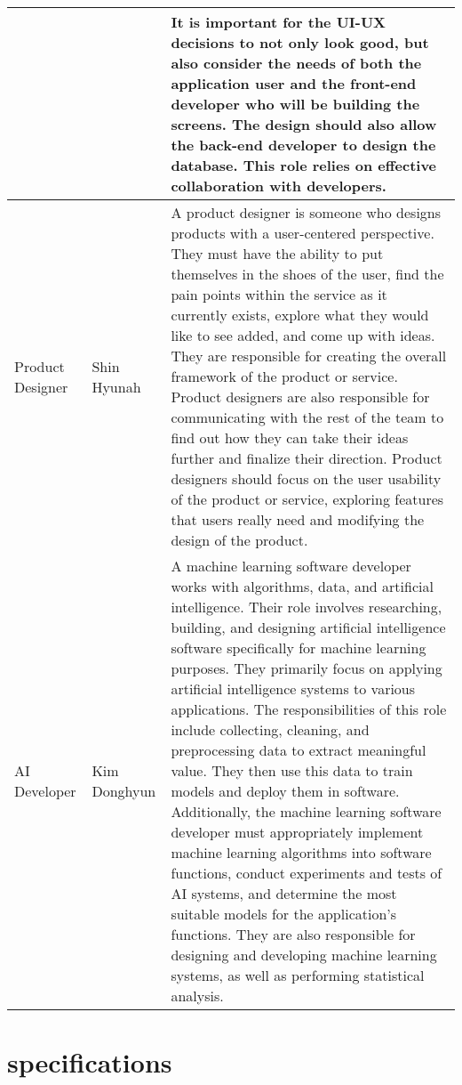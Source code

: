 \documentclass[conference, a4paper]{IEEEtran}
\begin{document}
\newpage 

\begin{table}[h]
\centering
\setlength{\tabcolsep}{12pt}
\renewcommand{\arraystretch}{1.5}
\begin{tabular}{|p{1cm}|p{1.5cm}|p{4cm}|}
\hline
& & It is important for the UI-UX decisions to not only look good, but also consider the needs of both the application user and the front-end developer who will be building the screens. The design should also allow the back-end developer to design the database. This role relies on effective collaboration with developers.\\
\hline
Product Designer & Shin Hyunah & A product designer is someone who designs products with a user-centered perspective. They must have the ability to put themselves in the shoes of the user, find the pain points within the service as it currently exists, explore what they would like to see added, and come up with ideas. They are responsible for creating the overall framework of the product or service. Product designers are also responsible for communicating with the rest of the team to find out how they can take their ideas further and finalize their direction. Product designers should focus on the user usability of the product or service, exploring features that users really need and modifying the design of the product.\\
\hline
AI Developer & Kim Donghyun & A machine learning software developer works with algorithms, data, and artificial intelligence. Their role involves researching, building, and designing artificial intelligence software specifically for machine learning purposes. They primarily focus on applying artificial intelligence systems to various applications. The responsibilities of this role include collecting, cleaning, and preprocessing data to extract meaningful value. They then use this data to train models and deploy them in software. Additionally, the machine learning software developer must appropriately implement machine learning algorithms into software functions, conduct experiments and tests of AI systems, and determine the most suitable models for the application's functions. They are also responsible for designing and developing machine learning systems, as well as performing statistical analysis. \\
\hline
\end{tabular}
\end{table}


\section{specifications}
\end{document}
